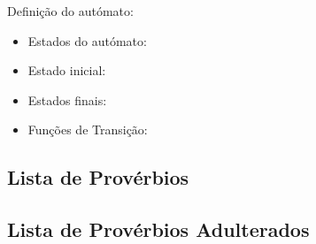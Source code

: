 \documentclass[11pt,a4paper]{report}
\begin{document}
Definição do autómato:

\begin{itemize}
	\item Estados do autómato:
	\item Estado inicial:
	\item Estados finais:
	\item Funções de Transição:
\end{itemize}


\subsection{Lista de Provérbios}


\subsection{Lista de Provérbios Adulterados}
\end{document}
